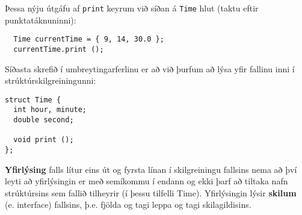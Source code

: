 Þessa nýju útgáfu af {\tt print} keyrum við síðan á {\tt Time} hlut (taktu eftir punktatáknuninni):

\begin{verbatim}
  Time currentTime = { 9, 14, 30.0 };
  currentTime.print ();
\end{verbatim}
%
Síðasta skrefið í umbreytingarferlinu er að við þurfum að lýsa yfir fallinu inni í strúktúrskilgreiningunni:

\begin{verbatim}
struct Time {
  int hour, minute;
  double second;

  void print ();
};
\end{verbatim}
%
{\bf Yfirlýsing} falls lítur eins út og fyrsta línan í skilgreiningu fallsins nema að því leyti að yfirlýsingin er með semíkommu í endann og ekki þarf að tiltaka nafn strúktúrsins sem fallið tilheyrir (í þessu tilfelli Time).
Yfirlýsingin lýsir {\bf skilum} (e. interface) fallsins, þ.e. fjölda og tagi leppa og tagi skilagildisins.

